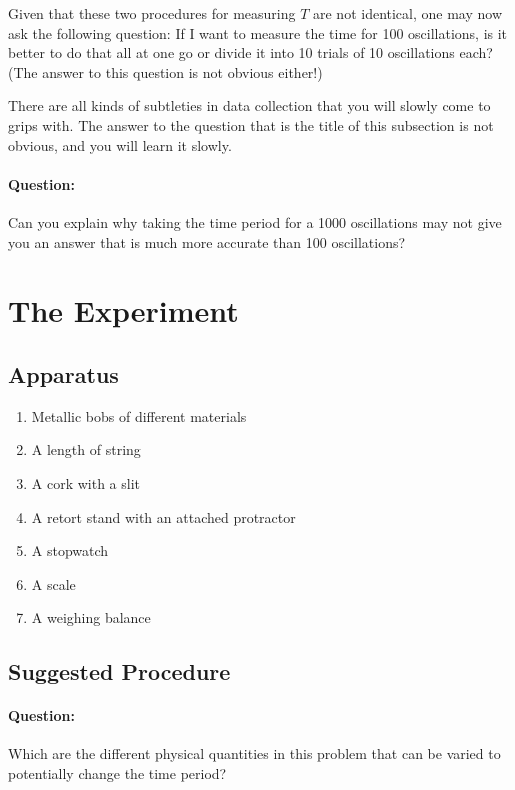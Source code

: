 Given that these two procedures for measuring $T$ are not identical, one may now ask the following question: If I want to measure the time for 100 oscillations, is it better to do that all at one go or divide it into 10 trials of 10 oscillations each? (The answer to this question is not obvious either!) 

There are all kinds of subtleties in data collection that you will slowly come to grips with. The answer to the question that is the title of this subsection is not obvious, and you will learn it slowly. 

\begin{question}
\paragraph{Question:} Can you explain why taking the time period for a 1000 oscillations may not give you an answer that is much more accurate than 100 oscillations?
\end{question}

\section{The Experiment}

\subsection{Apparatus}

\begin{enumerate}
    \item Metallic bobs of different materials
    \item A length of string
    \item A cork with a slit
    \item A retort stand with an attached protractor
    \item A stopwatch
    \item A scale
    \item A weighing balance
\end{enumerate}

\subsection{Suggested Procedure}

\begin{question} 
\paragraph{Question:} Which are the different physical quantities in this problem that can be varied to potentially change the time period?
\end{question}

